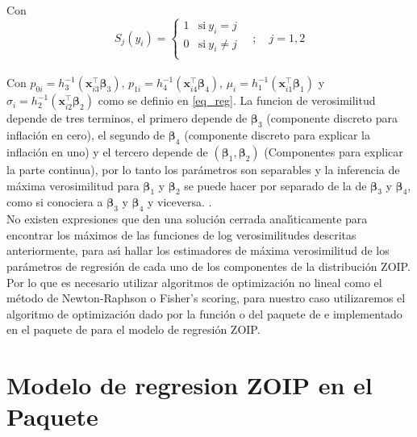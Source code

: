 Con
\[
S_j(y_i)=
\begin{cases}
1 & \text{si}\ y_i=j\\
0 & \text{si}\ y_i\neq j\\
\end{cases}
\quad ; \quad j=1,2
\]
\\
Con $p_{0i}=h_3^{-1}(\mathbf{x}_{i3}^{\top} \boldsymbol{\beta}_3)$, $p_{1i}=h_4^{-1}(\mathbf{x}_{i4}^{\top} \boldsymbol{\beta}_4)$, $\mu_i=h_1^{-1}(\mathbf{x}_{i1}^{\top} \boldsymbol{\beta}_1)$ y $\sigma_i=h_2^{-1}(\mathbf{x}_{i2}^{\top} \boldsymbol{\beta}_2)$ como se definio en \eqref{eq_reg}. La funcion de verosimilitud depende de tres terminos, el primero depende de  $\boldsymbol{\beta}_3$ (componente discreto para inflaci\'{o}n en cero), el segundo de $\boldsymbol{\beta}_4$ (componente discreto para explicar la inflaci\'{o}n en uno) y el tercero depende de $(\boldsymbol{\beta}_1,\boldsymbol{\beta}_2)$ (Componentes para explicar la parte continua), por lo tanto los par\'{a}metros son separables y la inferencia de m\'{a}xima verosimilitud para $\boldsymbol{\beta}_1$ y $\boldsymbol{\beta}_2$ se puede hacer por separado de la de $\boldsymbol{\beta}_3$ y $\boldsymbol{\beta}_4$, como si conociera a $\boldsymbol{\beta}_3$ y $\boldsymbol{\beta}_4$ y viceversa. \citep{Ospina1}.\\

No existen expresiones que den una soluci\'{o}n cerrada anal\'{\i}ticamente para encontrar los m\'{a}ximos de las  funciones de log verosimilitudes descritas anteriormente, para as\'{\i} hallar los estimadores de m\'{a}xima verosimilitud de los par\'{a}metros de regresi\'{o}n de cada uno de los componentes de la distribuci\'{o}n ZOIP.  Por lo que es necesario utilizar algoritmos de optimizaci\'{o}n no lineal como el m\'{e}todo de Newton-Raphson o Fisher's scoring, para nuestro caso utilizaremos el algoritmo de optimizaci\'{o}n dado por la funci\'{o}n  o  del paquete  de  e implementado en el paquete  de  para el modelo de regresi\'{o}n ZOIP.


\section{Modelo de regresion ZOIP en el Paquete }

